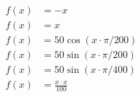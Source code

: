 \documentclass{article}
\begin{document}
\begin{equation}
\begin{split}
f(x) & = -x\\
f(x) & = x\\
f(x) & = 50 \cos (x \cdot \pi / 200)\\
f(x) & = 50 \sin (x \cdot \pi / 200)\\
f(x) & = 50 \sin (x \cdot \pi / 400)\\
f(x) & = \frac{x \cdot x}{100}\\
\end{split}
\end{equation}
\end{document}
